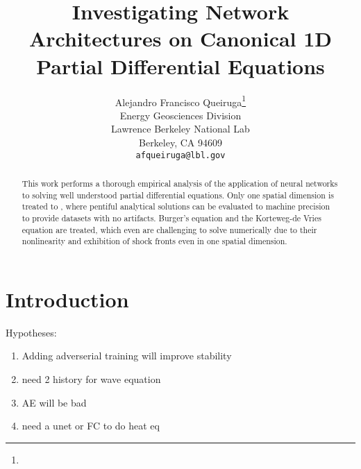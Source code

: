 \documentclass{article}
\title{Investigating Network Architectures on Canonical 1D Partial Differential Equations}
\author{%
  Alejandro Francisco Queiruga\thanks{} \\
  Energy Geosciences Division\\
  Lawrence Berkeley National Lab\\
  Berkeley, CA 94609\\
  \texttt{afqueiruga@lbl.gov} \\
}
\begin{document}
\maketitle

\begin{abstract}
  This work performs a thorough empirical analysis of the application
  of neural networks to solving well understood partial differential
  equations. Only one spatial dimension is treated to , where pentiful analytical solutions can be evaluated to machine precision to provide datasets with no artifacts.
  Burger's equation and the Korteweg-de Vries equation are treated,
  which even are challenging to solve numerically due
  to their nonlinearity and exhibition of shock fronts even in one spatial dimension.
\end{abstract}

\section{Introduction}

Hypotheses:
\begin{enumerate}
  \item Adding adverserial training will improve stability
  \item need 2 history for wave equation
  \item AE will be bad
    \item need a unet or FC to do heat eq
\end{enumerate}
\end{document}
